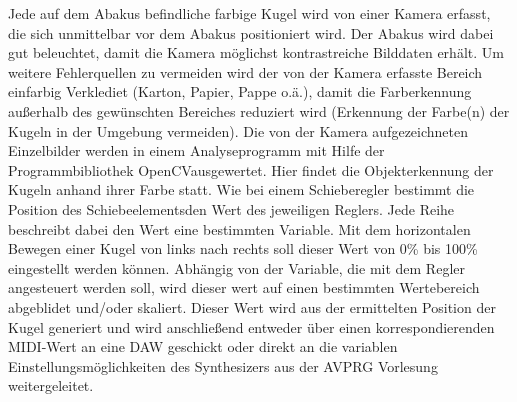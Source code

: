 \documentclass[12pt]{Article}
\begin{document}
Jede auf dem Abakus befindliche farbige Kugel wird von einer Kamera erfasst, die sich unmittelbar vor dem Abakus positioniert wird. Der Abakus wird dabei gut beleuchtet, damit die Kamera möglichst kontrastreiche Bilddaten erhält. Um weitere Fehlerquellen zu vermeiden wird der von der Kamera erfasste Bereich einfarbig Verklediet (Karton, Papier, Pappe o.ä.), damit die Farberkennung außerhalb des gewünschten Bereiches reduziert wird (Erkennung der Farbe(n) der Kugeln in der Umgebung vermeiden). Die von der Kamera aufgezeichneten Einzelbilder werden in einem Analyseprogramm mit Hilfe der Programmbibliothek \glqq OpenCV\grqq ausgewertet. Hier findet die Objekterkennung der Kugeln anhand ihrer Farbe statt. Wie bei einem Schieberegler bestimmt die Position des \glqq Schiebeelements\grqq den Wert des jeweiligen Reglers. Jede Reihe beschreibt dabei den Wert eine bestimmten Variable. Mit dem horizontalen Bewegen einer Kugel von links nach rechts soll dieser Wert von 0\% bis 100\% eingestellt werden können. Abhängig von der Variable, die mit dem Regler angesteuert werden soll, wird dieser wert auf einen bestimmten Wertebereich abgeblidet und/oder skaliert. Dieser Wert wird aus der ermittelten Position der Kugel generiert und wird anschließend entweder über einen korrespondierenden MIDI-Wert an eine DAW geschickt oder direkt an die variablen Einstellungsmöglichkeiten des Synthesizers aus der AVPRG Vorlesung weitergeleitet.
\end{document}
